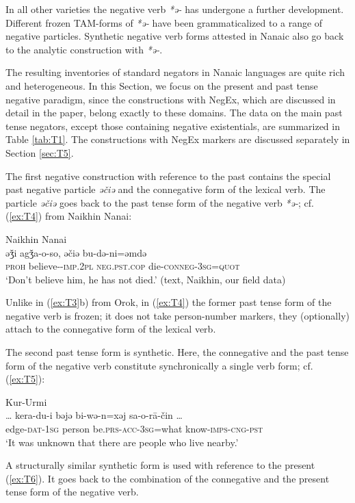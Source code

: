 \documentclass[output=paper]{langscibook}
\begin{document}
In all other varieties the negative verb \textit{*ə-} has undergone a further development. Different frozen TAM-forms of \textit{*ə-} have been grammaticalized to a range of negative particles. Synthetic negative verb forms attested in Nanaic also go back to the analytic construction with \textit{*ə-}.

The resulting inventories of standard negators in Nanaic languages are quite rich and heterogeneous. In this Section, we focus on the present and past tense negative paradigm, since the constructions with NegEx, which are discussed in detail in the paper, belong exactly to these domains. The data on the main past tense negators, except those containing negative existentials, are summarized in Table \ref{tab:T1}. The constructions with NegEx markers are discussed separately in Section \ref{sec:T5}.

The first negative construction with reference to the past contains the special past negative particle \textit{əčiə} and the connegative form of the lexical verb. The particle \textit{əčiə} goes back to the past tense form of the negative verb \textit{*ə-}; cf. (\ref{ex:T4}) from Naikhin Nanai:

\ea Naikhin Nanai \label{ex:T4}\\
	\gll əǯi		agǯa-o-so,			əčiə				bu-də-ni=əmdə\\
	\textsc{proh}	believe--\textsc{imp.2pl}	\textsc{neg.pst.cop}	die-\textsc{conneg-3sg=quot}\\
	\glt `Don’t believe him, he has not died.' (text, Naikhin, our field data)
\z

Unlike in (\ref{ex:T3}b) from Orok, in (\ref{ex:T4}) the former past tense form of the negative verb is frozen; it does not take person-number markers, they (optionally) attach to the connegative form of the lexical verb.

The second past tense form is synthetic. Here, the connegative and the past tense form of the negative verb constitute synchronically a single verb form; cf. (\ref{ex:T5}):

\ea Kur-Urmi \label{ex:T5}\\
	\gll … kera-du-i	bəjə	bi-wə-n=xəj	{sa-o-rā-čin …}\\
	{} edge-\textsc{dat-1sg}	person	be.\textsc{prs-acc-3sg}=what	know-\textsc{imps-cng-pst} {}\\
	\glt `It was unknown that there are people who live nearby.' \citep[145, text]{sunik1958a}
\z

A structurally similar synthetic form is used with reference to the present (\ref{ex:T6}). It goes back to the combination of the connegative and the present tense form of the negative verb.
\end{document}
